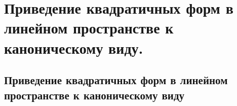 \chapter{Приведение квадратичных форм в линейном пространстве к каноническому виду.}
\section{Приведение квадратичных форм в линейном пространстве к каноническому виду}